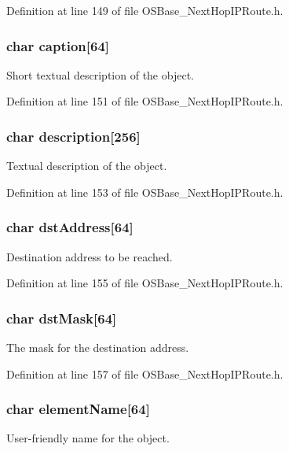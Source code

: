 Definition at line 149 of file OSBase\_\-NextHopIPRoute.h.\hypertarget{structnext_hop_i_p_aedfd9c5424c9aa2ef6df1a16f9220d6f}{
\subsubsection[{caption}]{\setlength{\rightskip}{0pt plus 5cm}char {\bf caption}\mbox{[}64\mbox{]}}}
\label{structnext_hop_i_p_aedfd9c5424c9aa2ef6df1a16f9220d6f}
Short textual description of the object. 

Definition at line 151 of file OSBase\_\-NextHopIPRoute.h.\hypertarget{structnext_hop_i_p_a18afc38b5c05344b661e1b3b01c1d0e5}{
\subsubsection[{description}]{\setlength{\rightskip}{0pt plus 5cm}char {\bf description}\mbox{[}256\mbox{]}}}
\label{structnext_hop_i_p_a18afc38b5c05344b661e1b3b01c1d0e5}
Textual description of the object. 

Definition at line 153 of file OSBase\_\-NextHopIPRoute.h.\hypertarget{structnext_hop_i_p_a77912431e140e25feea99d857db3dbb7}{
\subsubsection[{dstAddress}]{\setlength{\rightskip}{0pt plus 5cm}char {\bf dstAddress}\mbox{[}64\mbox{]}}}
\label{structnext_hop_i_p_a77912431e140e25feea99d857db3dbb7}
Destination address to be reached. 

Definition at line 155 of file OSBase\_\-NextHopIPRoute.h.\hypertarget{structnext_hop_i_p_a9326a67cd8ca1dcf2e339ecf7731634d}{
\subsubsection[{dstMask}]{\setlength{\rightskip}{0pt plus 5cm}char {\bf dstMask}\mbox{[}64\mbox{]}}}
\label{structnext_hop_i_p_a9326a67cd8ca1dcf2e339ecf7731634d}
The mask for the destination address. 

Definition at line 157 of file OSBase\_\-NextHopIPRoute.h.\hypertarget{structnext_hop_i_p_a1c9372777e720027e94df62b3274a7fb}{
\subsubsection[{elementName}]{\setlength{\rightskip}{0pt plus 5cm}char {\bf elementName}\mbox{[}64\mbox{]}}}
\label{structnext_hop_i_p_a1c9372777e720027e94df62b3274a7fb}
User-\/friendly name for the object. 

